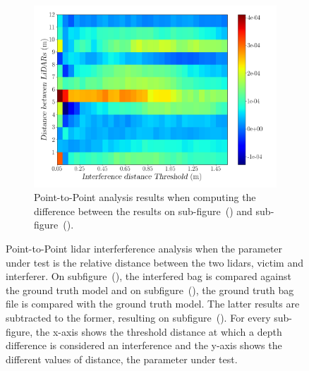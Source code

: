 \begin{figure}[!ht]
\begin{subfigure}[c]{0.45\textwidth}
		\label{fig:distance:ground-truth-color-mesh}
	\end{subfigure}
	\\ \vspace{4mm}
	\begin{subfigure}[c]{0.8\textwidth}
		\includegraphics[width=\textwidth]{img/lidar-interference/distance/difference_ground_truth_interference_measurement.png}
		\caption{Point-to-Point analysis results when computing the difference between the results on sub-figure~() and sub-figure~().}
		\label{fig:distance:difference-color-mesh}
	\end{subfigure}

	\caption{Point-to-Point \ac{lidar} interferference analysis when the parameter under test is the relative distance between the two \acp{lidar}, victim and interferer. On subfigure~(), the interfered bag is compared against the ground truth model and on subfigure~(), the ground truth bag file is compared with the ground truth model. The latter results are subtracted to the former, resulting on subfigure~(). For every sub-figure, the x-axis shows the threshold distance at which a depth difference is considered an interference and the y-axis shows the different values of distance, the parameter under test.}
	\label{fig:distance:color-mesh}
\end{figure}

